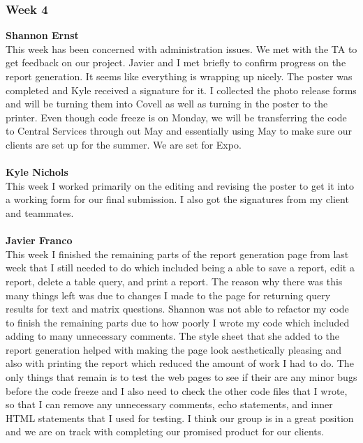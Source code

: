 \documentclass[../final.tex]{subfiles}
\begin{document}
\subsubsection{Week 4}
\textbf{Shannon Ernst}\\
This week has been concerned with administration issues. We met with the TA to get feedback on our project. Javier and I met briefly to confirm progress on the report generation. It seems like everything is wrapping up nicely. The poster was completed and Kyle received a signature for it. I collected the photo release forms and will be turning them into Covell as well as turning in the poster to the printer. Even though code freeze is on Monday, we will be transferring the code to Central Services through out May and essentially using May to make sure our clients are set up for the summer. We are set for Expo.\\ \\
\textbf{Kyle Nichols}\\
This week I worked primarily on the editing and revising the poster to get it into a working form for our final submission. I also got the signatures from my client and teammates. \\ \\
\textbf{Javier Franco}\\
This week I finished the remaining parts of the report generation page from last week that I still needed to do which included being a able to save a report, edit a report, delete a table query, and print a report. The reason why there was this many things left was due to changes I made to the page for returning query results for text and matrix questions. Shannon was not able to refactor my code to finish the remaining parts due to how poorly I wrote my code which included adding to many unnecessary comments. The style sheet that she added to the report generation helped with making the page look aesthetically pleasing and also with printing the report which reduced the amount of work I had to do. The only things that remain is to test the web pages to see if their are any minor bugs before the code freeze and I also need to check the other code files that I wrote, so that I can remove any unnecessary comments, echo statements, and inner HTML statements that I used for testing. I think our group is in a great position and we are on track with completing our promised product for our clients. \\
\end{document}
